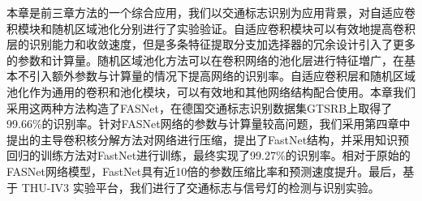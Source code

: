 本章是前三章方法的一个综合应用，我们以交通标志识别为应用背景，对自适应卷积模块和随机区域池化分别进行了实验验证。自适应卷积模块可以有效地提高卷积层的识别能力和收敛速度，但是多条特征提取分支加选择器的冗余设计引入了更多的参数和计算量。随机区域池化方法可以在卷积网络的池化层进行特征増广，在基本不引入额外参数与计算量的情况下提高网络的识别率。自适应卷积层和随机区域池化作为通用的卷积和池化模块，可以有效地和其他网络结构配合使用。本章我们采用这两种方法构造了FASNet，在德国交通标志识别数据集GTSRB上取得了99.66\%的识别率。针对FASNet网络的参数与计算量较高问题，我们采用第四章中提出的主导卷积核分解方法对网络进行压缩，提出了FastNet结构，并采用知识预回归的训练方法对FastNet进行训练，最终实现了99.27\%的识别率。相对于原始的FASNet网络模型，FastNet具有近10倍的参数压缩比率和预测速度提升。最后，基于 THU-IV3 实验平台，我们进行了交通标志与信号灯的检测与识别实验。


